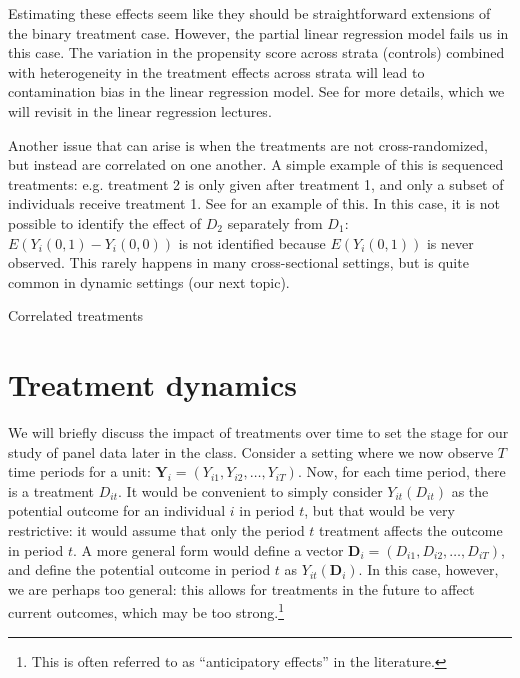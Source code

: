 \documentclass{tufte-handout}
\theoremstyle{break}
\newcommand{\bY}{\mathbf{Y}}
\newcommand{\bD}{\mathbf{D}}
\begin{document}
Estimating these effects seem like they should be straightforward extensions of the binary treatment case. However, the partial linear regression model fails us in this case. The variation in the propensity score across strata (controls) combined with heterogeneity in the treatment effects across strata will lead to contamination bias in the linear regression model. See \citet{goldsmith2022contamination} for more details, which we will revisit in the linear regression lectures.

Another issue that can arise is when the treatments are not cross-randomized, but instead are correlated on one another. A simple example of this is sequenced treatments: e.g. treatment 2 is only given after treatment 1, and only a subset of individuals receive treatment 1. See  for an example of this. In this case, it is not possible to identify the effect of $D_{2}$ separately from $D_{1}$: $E(Y_{i}(0,1) - Y_{i}(0,0))$ is not identified because $E(Y_{i}{(0,1)})$ is never observed. This rarely happens in many cross-sectional settings, but is quite common in dynamic settings (our next topic).
\begin{marginfigure}
  \caption{Correlated treatments}
  \label{fig:correlatedtreatment}
\end{marginfigure}

\section{Treatment dynamics}
We will briefly discuss the impact of treatments over time to set the stage for our study of panel data later in the class. Consider a setting where we now observe $T$ time periods for a unit: $\bY_{i} = (Y_{i1}, Y_{i2}, \ldots, Y_{iT})$. Now, for each time period, there is a treatment $D_{it}$. It would be convenient to simply consider $Y_{it}(D_{it})$ as the potential outcome for an individual $i$ in period $t$, but that would be very restrictive: it would assume that only the period $t$ treatment affects the outcome in period $t$. A more general form would define a vector $\bD_{i} = (D_{i1}, D_{i2}, \ldots, D_{iT})$, and define the potential outcome in period $t$ as $Y_{it}(\bD_{i})$. In this case, however, we are perhaps too general: this allows for treatments in the future to affect current outcomes, which may be too strong.\footnote{This is often referred to as ``anticipatory effects'' in the literature.}
\end{document}
